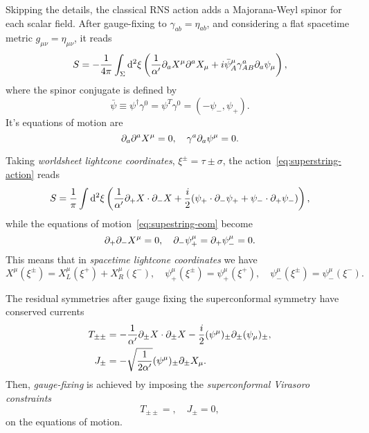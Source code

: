 Skipping the details, the classical RNS action adds a Majorana-Weyl spinor for each scalar field. After gauge-fixing to $\gamma_{ab} = \eta_{ab}$, and considering a flat spacetime metric $g_{\mu\nu} = \eta_{\mu\nu}$, it reads
\begin{equation}\label{eq:superstring-action}
    S = -\frac{1}{4\pi} \int_\Sigma \mathop{}\!\mathrm{d}^2 \xi \left( \frac{1}{\alpha'} \partial_a X^\mu \partial^a X_\mu + i \bar{\psi}^\mu_A \gamma^a_{AB} \partial_a \psi_\mu \right),
\end{equation}
where the spinor conjugate is defined by
\begin{equation}
    \bar{\psi} \equiv \psi^\dagger \gamma^0 = \psi^T \gamma^0 = (-\psi_-, \psi_+).
\end{equation}
It's equations of motion are
\begin{equation}\label{eq:supestring-eom}
    \partial_a \partial^a X^\mu = 0, \quad \gamma^a \partial_a \psi^\mu = 0.
\end{equation}

Taking \emph{worldsheet lightcone coordinates}, $\xi^\pm = \tau \pm \sigma$, the action~\eqref{eq:superstring-action} reads
\begin{equation}
    S = \frac{1}{\pi} \int \mathop{}\!\mathrm{d}^2 \xi \left( \frac{1}{\alpha'} \partial_+ X \cdot \partial_- X + \frac{i}{2} (\psi_+ \cdot \partial_- \psi_+ + \psi_- \cdot \partial_+ \psi_-) \right) ,
\end{equation}
while the equations of motion~\eqref{eq:supestring-eom} become
\begin{equation}\label{eq:superstring-lightcone-eom}
    \partial_+ \partial_- X^\mu = 0, \quad \partial_- \psi^\mu_+ = \partial_+ \psi^\mu_- = 0 .
\end{equation}
This means that in \emph{spacetime lightcone coordinates} we have 
\begin{equation}\label{eq:ligthcone-coordinates-split}
    X^\mu (\xi^\pm) = X^\mu_L (\xi^+) + X^\mu_R(\xi^-), \quad \psi^\mu_+ (\xi^\pm) = \psi^\mu_+ (\xi^+), \quad \psi^\mu_- (\xi^\pm) = \psi^\mu_- (\xi^-) .
\end{equation}

The residual symmetries after gauge fixing the superconformal symmetry have conserved currents
\begin{equation}
\begin{aligned}
    T_{\pm\pm} &= -\frac{1}{\alpha'} \partial_\pm X \cdot \partial_\pm X - \frac{i}{2} (\psi^\mu)_\pm \partial_\pm (\psi_\mu)_\pm , \\
    J_\pm &= - \sqrt{\frac{1}{2\alpha'}} (\psi^\mu)_\pm \partial_\pm X_\mu.
\end{aligned}
\end{equation}
Then, \emph{gauge-fixing} is achieved by imposing the \emph{superconformal Virasoro constraints}
\begin{equation}
    T_{\pm\pm} = , \quad J_{\pm} = 0,
\end{equation}
on the equations of motion. 

